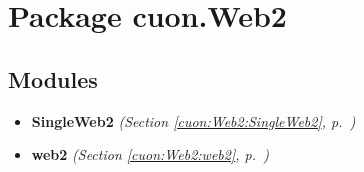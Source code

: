 %
%
%


\section{Package cuon.Web2}

    \label{cuon:Web2}


\subsection{Modules}

\begin{itemize}
\setlength{\parskip}{0ex}
\item \textbf{SingleWeb2}
  \textit{(Section \ref{cuon:Web2:SingleWeb2}, p.~\pageref{cuon:Web2:SingleWeb2})}

\item \textbf{web2}
  \textit{(Section \ref{cuon:Web2:web2}, p.~\pageref{cuon:Web2:web2})}

\end{itemize}

